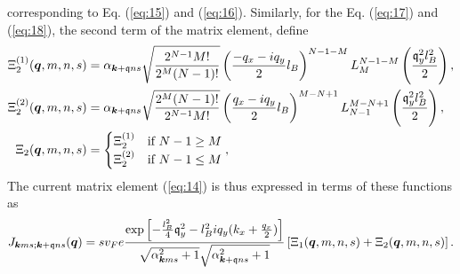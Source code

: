 corresponding to Eq. (\ref{eq:15}) and (\ref{eq:16}).
Similarly, for the Eq. (\ref{eq:17}) and (\ref{eq:18}), the second term of the matrix element, define
\begin{align}
  \Xi_2 ^{(1)}(\bm{q}, m, n, s) &= \alpha _{\bm{k} + \mathfrak{q} ns} \sqrt{\frac{2^{N-1} M!}{2^M (N-1)!}}
                                   \left( \frac{-q_x - iq_y}{2} l_B \right)^{N-1 - M}
                                   L^{N-1 -M}_{M} \left( \frac{\mathfrak{q}_y^2 l_B^2}{2} \right),\\
  \Xi_2 ^{(2)}(\bm{q}, m, n, s) &= \alpha _{\bm{k} + \mathfrak{q} ns} \sqrt{\frac{2^M (N-1)!}{2^{N-1} M!}}
                                   \left( \frac{q_x - iq_y}{2} l_B \right)^{M-N + 1}
                                   L^{M - N + 1}_{N-1} \left( \frac{\mathfrak{q}_y^2 l_B^2}{2} \right),\\
  \Xi_2(\bm{q}, m, n, s) &=
          \begin{cases}
            \Xi _2 ^{(1)} & \text{if } N-1 \geq M\\
            \Xi _2 ^{(2)} & \text{if } N-1 \leq M
          \end{cases}, \label{eq:23}
\end{align}
The current matrix element (\ref{eq:14}) is thus expressed in terms of these functions as
\begin{equation}
  J_{\bm{k}ms; \bm{k}+\mathfrak{q} ns}(\bm{q}) =
  sv_Fe
  \frac{
    \exp \left[
      -\frac{l_B^2}{4}  \mathfrak{q}_y^2 - l_B^2 i q_y(k_x + \frac{q_x}{2})
    \right]
  }{
    \sqrt{\alpha _{\bm{k}ms}^2 +1}
    \sqrt{\alpha _{\bm{k}+\mathfrak{q} ns}^2 + 1}
  }
  \left[ \Xi _1(\bm{q}, m, n, s) + \Xi _2(\bm{q}, m, n, s) \right].
\end{equation}


